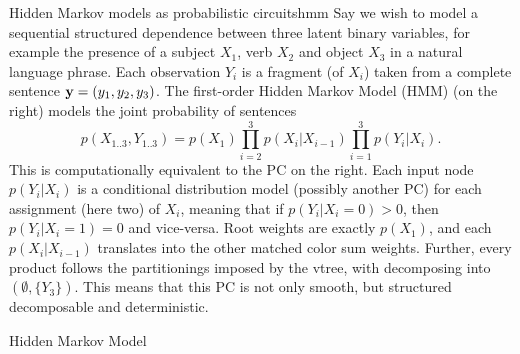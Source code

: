 \begin{example}[sidebyside,lefthand width=0.55\textwidth]{Hidden Markov models as probabilistic circuits}{hmm}
  Say we wish to model a sequential structured dependence between three latent binary variables, for
  example the presence of a subject $X_1$, verb $X_2$ and object $X_3$ in a natural language
  phrase. Each observation $Y_i$ is a fragment (of $X_i$) taken from a complete sentence
  $\mathbf{y}=(y_1,y_2,y_3)$. The first-order Hidden Markov Model (HMM) (on the right) models the
  joint probability of sentences
  \begin{equation}
    p(X_{1..3},Y_{1..3})=p(X_1)\prod_{i=2}^3 p(X_i|X_{i-1})\prod_{i=1}^3 p(Y_i|X_i).
  \end{equation}
  This is computationally equivalent to the PC on the right. Each input node $p(Y_i|X_i)$ is a
  conditional distribution model (possibly another PC) for each assignment (here two) of $X_i$,
  meaning that if $p(Y_i|X_i=0)>0$, then $p(Y_i|X_i=1)=0$ and vice-versa. Root weights are exactly
  $p(X_1)$, and each $p(X_i|X_{i-1})$ translates into the other matched color sum weights. Further,
  every product follows the partitionings imposed by the vtree, with
  \inode[fill=boxgray!80]{\newProdNode} decomposing into $(\emptyset,\{Y_3\})$. This means that
  this PC is not only smooth, but structured decomposable and deterministic.
  \tcblower
  \begin{center}

    \vskip -0.25cm
    \small%
    Hidden Markov Model


\end{center}
\end{example}
